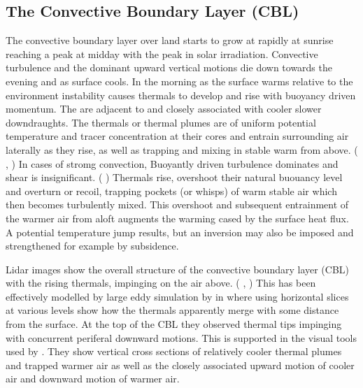 \subsection{The Convective Boundary Layer (CBL)}

The convective boundary layer over land starts to grow at rapidly at sunrise reaching a peak at midday with the peak in solar irradiation.
Convective turbulence and the dominant upward vertical motions die down towards the evening and as surface cools. In the morning as the 
surface warms relative to the environment instability causes thermals to develop and rise with buoyancy driven momentum. The are adjacent to 
and closely associated with cooler slower downdraughts.  The thermals or thermal plumes are of uniform potential temperature and tracer 
concentration at their cores and entrain surrounding air laterally as they rise, as well as trapping and mixing in stable warm from above. 
( \cite{Stull-BLMetIntro}, \citeauthor{CrumStullEl} \cite{CrumStullEl}) In cases of stromg convection, 
Buoyantly driven turbulence dominates and shear is insignificant. ( \cite{DirLEddy}) Thermals rise, overshoot their
natural buouancy level and overturn or recoil, trapping pockets (or whisps) of warm stable air which then becomes turbulently mixed.  This
overshoot and subsequent entrainment of the warmer air from aloft augments the warming cased by the surface heat flux.  A potential
temperature jump results, but an inversion may also be imposed and strengthened for example by subsidence.  

Lidar images show the overall structure of the convective boundary layer (\acs{CBL}) with the rising thermals, impinging on the air above.
(\citeauthor{CrumStullEl} \cite{CrumStullEl}, \citeauthor{Traum11} \cite{Traum11}) This has been effectively modelled by large eddy simulation
by \citeauthor{SchmidtSchu} in \cite{SchmidtSchu} where using horizontal slices at various levels show how the thermals apparently merge 
with some distance from the surface.  At the top of the \acs{CBL} they observed thermal tips impinging with concurrent periferal downward motions.
This is supported in the visual tools used by \citeauthor{SullMoengStev} \cite{SullMoengStev}.  They show vertical cross sections of relatively cooler thermal plumes and trapped warmer air as well as the closely associated upward motion of cooler air and downward motion of warmer air.\\ 

